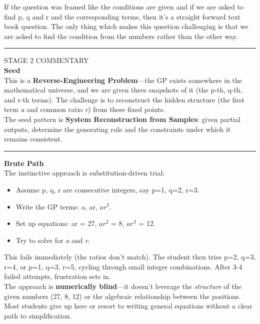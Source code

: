 \documentclass{article}
\begin{document}
\noindent If the question was framed like the conditions are given and if we are asked to find p, q and r and the corresponding terms, then it's a straight forward text book question. The only thing which makes this question challenging is that we are asked to find the condition from the numbers rather than the other way. \\

\noindent \rule{\textwidth}{0.4pt}

\noindent STAGE 2 COMMENTARY \\

\noindent \textbf{Seed} \\

\noindent This is a \textbf{Reverse-Engineering Problem}—the GP exists somewhere in the mathematical universe, and we are given three snapshots of it (the p-th, q-th, and r-th terms). The challenge is to reconstruct the hidden structure (the first term \textit{a} and common ratio \textit{r}) from these fixed points. \\

\noindent The seed pattern is \textbf{System Reconstruction from Samples}: given partial outputs, determine the generating rule and the constraints under which it remains consistent. \\

\noindent \rule{\textwidth}{0.4pt}

\noindent \textbf{Brute Path} \\

\noindent The instinctive approach is substitution-driven trial:
\begin{itemize}
    \item Assume p, q, r are consecutive integers, say p=1, q=2, r=3.
    \item Write the GP terms: a, ar, $ar^2$.
    \item Set up equations: ar = 27, $ar^2$ = 8, $ar^3$ = 12.
    \item Try to solve for \textit{a} and \textit{r}.
\end{itemize}
\noindent This fails immediately (the ratios don't match). The student then tries p=2, q=3, r=4, or p=1, q=3, r=5, cycling through small integer combinations. After 3-4 failed attempts, frustration sets in. \\

\noindent The approach is \textbf{numerically blind}—it doesn't leverage the \textit{structure} of the given numbers (27, 8, 12) or the algebraic relationship between the positions. Most students give up here or resort to writing general equations without a clear path to simplification. \\
\end{document}
